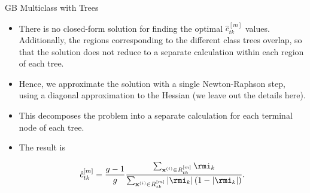 \documentclass[11pt,compress,t,notes=noshow, xcolor=table]{beamer}
\begin{document}
\begin{vbframe}{GB Multiclass with Trees}
\framebreak


\begin{itemize}

  \item There is no closed-form solution for finding the optimal $\hat{c}_{tk}^{[m]}$ values. Additionally, the regions corresponding to the different class trees overlap, so that the solution does not reduce to a separate calculation within each region of each tree.

  \item Hence, we approximate the solution with a single Newton-Raphson step, using a diagonal approximation to the Hessian (we leave out the details here).

  \item This decomposes the problem into a separate calculation for each terminal node of each tree.

  \item The result is

  $$\hat{c}_{tk}^{[m]} =
      \frac{g-1}{g}\frac{\sum_{\xi \in R_{tk}^{[m]}} \rmi_k}{\sum_{\xi \in R_{tk}^{[m]}} \left|\rmi_k\right|\left(1 - \left|\rmi_k\right|\right)}.$$


\end{itemize}

\framebreak




\end{vbframe}
\end{document}
